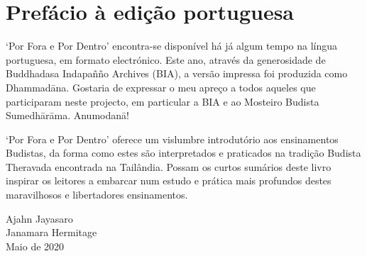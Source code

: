 \cleartorecto
\chapter{Prefácio à edição portuguesa}

{\fontsize{10.5}{13.5}\selectfont

‘Por Fora e Por Dentro’ encontra-se disponível há já algum tempo na língua
portuguesa, em formato electrónico. Este ano, através da generosidade de
Buddhadasa Indapañño Archives (BIA), a versão impressa foi produzida como
Dhammadāna. Gostaria de expressar o meu apreço a todos aqueles que participaram
neste projecto, em particular a BIA e ao Mosteiro Budista Sumedhārāma.
Anumodanā!

‘Por Fora e Por Dentro’ oferece um vislumbre introdutório aos ensinamentos
Budistas, da forma como estes são interpretados e praticados na tradição Budista
Theravada encontrada na Tailândia. Possam os curtos sumários deste livro
inspirar os leitores a embarcar num estudo e prática mais profundos destes
maravilhosos e libertadores ensinamentos.

\bigskip

{\raggedleft
  Ajahn Jayasaro\\
  Janamara Hermitage\\
  Maio de 2020
\par}

}

